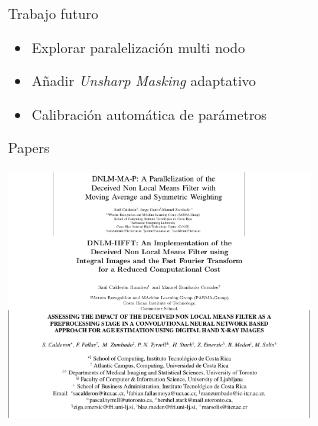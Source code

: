 \documentclass[15pt]{beamer} %
\begin{document}
\begin{frame}{Trabajo futuro}
  
  \begin{itemize}
  \item Explorar paralelizaci\'on multi nodo 
  \item A\~nadir \textit{Unsharp Masking} adaptativo
  \item Calibraci\'on automática de par\'ametros
  \end{itemize}
  
\end{frame}




\begin{frame}{Papers}
	\begin{center}
	\includegraphics[width=0.6\textwidth]{paper}
	\end{center}
  
\end{frame}
\end{document}

